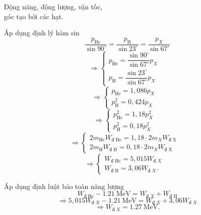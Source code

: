 \begin{dang}{Động năng, động lượng, vận tốc,\\ góc tạo bởi các hạt.}
{		Áp dụng định lý hàm sin
		\begin{equation*}
			\dfrac{p_\text{He}}{\sin 90^\circ}=\dfrac{p_\text{H}}{\sin 23^\circ}=\dfrac{p_X}{\sin 67^\circ}
		\end{equation*}
		\begin{equation*}
			\Rightarrow
			\left\{\begin{array}{ll}{p_\text{He}=\dfrac{\sin 90^\circ}{\sin 67^\circ}{p_X}}&\\
				{p_\text{H}=\dfrac{\sin 23^\circ}{\sin 67^\circ}{p_X}}&\end{array}\right.
		\end{equation*}
		\begin{equation*}
			\Rightarrow\left\{\begin{array}{ll}{p_\text{He}=1,086p_X}&\\{p_\text{H}^{2}=0,424p_X}&\end{array}\right.
		\end{equation*}
		\begin{equation*}
			\Rightarrow\left\{\begin{array}{ll}{p_\text{He}^{2}=1,18p_X^2}&\\{p_\text{H}^{2}=0,18p_X^2}&\end{array}\right.
		\end{equation*}
		\begin{equation*}
			\Rightarrow \left\{\begin{array}{ll}{2{m_\text{He}}{W_\textrm{đ He}}=1,18\cdot2{m_X}{W_\textrm{đ X}}}&\\
				{2{m_\text{H}}{W_\textrm{đ H}}=0,18\cdot2{m_X}{W_\textrm{đ X}}}&\end{array}\right.
		\end{equation*}
		\begin{equation*}
			\Rightarrow \left\{\begin{array}{ll}{{W_\textrm{đ He}}=5,015W_{\textrm{đ }X}}&\\
				{{W_\textrm{đ H}}=3,06W_{\textrm{đ }X}}.&\end{array}\right.
		\end{equation*}
		
		
		Áp dụng định luật bảo toàn năng lượng
		\begin{equation*}
			W_\textrm{đ He} - \SI{1,21}{\mega\electronvolt}= W_{\textrm{đ }X} + W_\textrm{đ H}
		\end{equation*}
		\begin{equation*}
			\Rightarrow 5,015W_{\textrm{đ }X} - \SI{1,21}{\mega\electronvolt} = W_{\textrm{đ }X} + 3,06W_{\textrm{đ }X}
		\end{equation*}
		\begin{equation*}
			\Rightarrow W_{\textrm{đ }X}=\SI{1,27}{\mega\electronvolt}.
		\end{equation*}
		
}
\end{dang}
